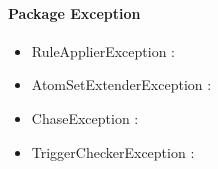         
        
    \paragraph{Package Exception}
        \begin{itemize}
            \item RuleApplierException :
            \item AtomSetExtenderException :
            \item ChaseException :
            \item TriggerCheckerException :
        \end{itemize}
        